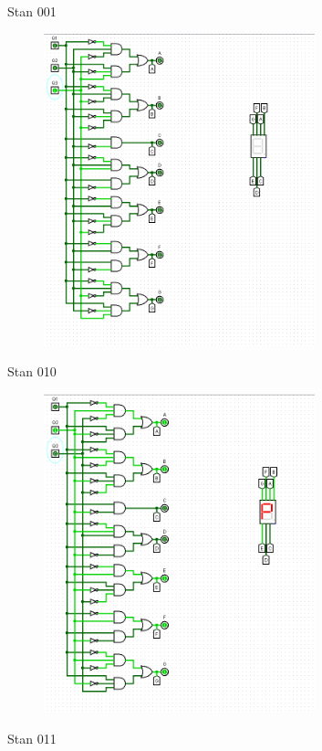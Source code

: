 \documentclass[]{article}
\begin{document}
\newpage
Stan 001
\begin{figure}[H]
	\centering
	\includegraphics[width=0.7\textwidth]{TTRZY_001.png}
\end{figure}
\newpage
Stan 010
\begin{figure}[H]
	\centering
	\includegraphics[width=0.7\textwidth]{TTRZY_010.png}
\end{figure}
\newpage
Stan 011
\end{document}
